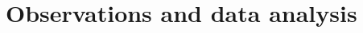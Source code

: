 \documentclass[manuscript]{emulateapj}
\newcommand{\lya}{Ly$\alpha$}
\newcommand{\ha}{H$\alpha$}
\newcommand{\hb}{H$\beta$}
\newcommand{\oiii}{[O~{\small III}]}
\newcommand{\nii}{[N~{\small II]}}
\newcommand{\kms}{km s$^{-1}$}
\begin{document}




\section{Observations and data analysis}\label{sec:data}
\end{document}
